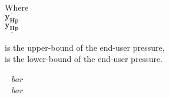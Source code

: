\begin{minipage}[t]{0.20\textwidth}
Where\\
\hspace*{8mm} $ \overline{\bm{y_{Hp}}} $ \\
\hspace*{8mm} $ \underline{\bm{y_{Hp}}} $ 
\end{minipage}
\begin{minipage}[t]{0.68\textwidth}
\vspace*{2mm}
is the upper-bound of the end-user pressure, \\
is the lower-bound of the end-user pressure. 
\end{minipage}
\begin{minipage}[t]{0.10\textwidth}
\vspace*{1.8mm}
\textcolor{White}{te}$\unit{bar}$\\
\textcolor{White}{te}$\unit{bar}$
\end{minipage}

%



